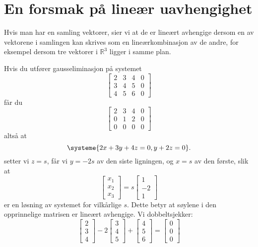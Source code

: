 \section*{En forsmak på lineær uavhengighet}
Hvis man har en samling vektorer, sier vi at de er lineært avhengige dersom en av vektorene i samlingen kan skrives som en lineærkombinasjon av de andre, for eksempel dersom tre vektorer i $\mathbb{R}^3$ ligger i samme plan.
\begin{ex}	
	Hvis du utfører gausseliminasjon på systemet
	\begin{equation*}
	\begin{bmatrix}
	2  &  3  &  4 & 0   \\
	3  & 4  &  5  & 0\\
	4  & 5  &  6 & 0 
	\end{bmatrix}
	\end{equation*}
	får du
	\begin{equation*}
	\begin{bmatrix}
	2  &  3  &  4 & 0   \\
	0  & 1  &  2  & 0\\
	0  & 0 &  0 & 0 
	\end{bmatrix}
	\end{equation*}
	altså at 
	\[
	\systeme{
		2x + 3y + 4z = 0,
		y + 2z = 0}.
	\]
	setter vi $z=s$, får vi $y=-2s$ av den siste ligningen, og $x=s$ av den første, slik at 
	\begin{equation*}
	\begin{bmatrix}
	x_1  \\
	x_2 \\
	x_3
	\end{bmatrix}
	=
	s
	\begin{bmatrix}
	1  \\
	-2 \\
	1
	\end{bmatrix}
	\end{equation*} 
	er en løsning av systemet for vilkårlige $s$. Dette betyr at søylene i den opprinnelige matrisen er lineært avhengige. Vi dobbeltsjekker:
	\begin{equation*}
	\begin{bmatrix}
	2  \\
	3 \\
	4
	\end{bmatrix}
	-2
	\begin{bmatrix}
	3  \\
	4 \\
	5
	\end{bmatrix}
	+
	\begin{bmatrix}
	4  \\
	5 \\
	6
	\end{bmatrix}
	=
	\begin{bmatrix}
	0  \\
	0 \\
	0
	\end{bmatrix}
	\end{equation*}
\end{ex}




\kapittelslutt
